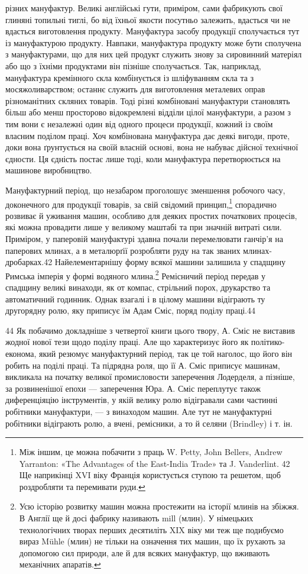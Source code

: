 різних мануфактур. Великі англійські гути, приміром, сами
фабрикують свої глиняні топильні тиглі, бо від їхньої якости
посутньо залежить, вдасться чи не вдасться виготовлення продукту.
Мануфактура засобу продукції сполучається тут із мануфактурою
продукту. Навпаки, мануфактура продукту може бути
сполучена з мануфактурами, що для них цей продукт служить
знову за сировинний матеріял або що з їхніми продуктами він
пізніше сполучається. Так, наприклад, мануфактура кремінного
скла комбінується із шліфуванням скла та з мосяжоливарством;
останнє служить для виготовлення металевих оправ різноманітних
скляних товарів. Тоді різні комбіновані мануфактури
становлять більш або менш просторово відокремлені відділи цілої
мануфактури, а разом з тим вони є незалежні один від одного
процеси продукції, кожний із своїм власним поділом праці. Хоч
комбінована мануфактура дає деякі вигоди, проте, доки вона
ґрунтується на своїй власній основі, вона не набуває дійсної
технічної єдности. Ця єдність постає лише тоді, коли мануфактура
перетворюється на машинове виробництво.

Мануфактурний період, що незабаром проголошує зменшення
робочого часу, доконечного для продукції товарів, за свій свідомий
принцип,\footnote{
Між іншим, це можна побачити з праць W. Petty, John Bellers,
Andrew Yarranton: «The Advantages of the East-India Trade» та J. Vanderlint.
42    Ще наприкінці XVI віку Франція користується ступою та решетом,
щоб роздробляти та перемивати руди.
} спорадично розвиває й уживання машин, особливо
для деяких простих початкових процесів, які можна провадити
лише у великому маштабі та при значній витраті сили. Приміром,
у паперовій мануфактурі здавна почали перемелювати ганчір’я
на паперових млинах, а в металюрґії розробляти руду на так
званих млинах-дробарках.42 Найелементарнішу форму всякої
машини залишила у спадщину Римська імперія у формі водяного
млина.\footnote{
Усю історію розвитку машин можна простежити на історії млинів
на збіжжя. В Англії ще й досі фабрику називають mill (млин). У
німецьких технологічних творах перших десятиліть XIX віку ми теж
ще подибуємо вираз Mühle (млин) не тільки на означення тих машин,
що їх рухають за допомогою сил природи, але й для всяких мануфактур,
що вживають механічних апаратів.
} Ремісничий період передав у спадщину великі винаходи,
як от компас, стрільний порох, друкарство та автоматичний
годинник. Однак взагалі і в цілому машини відіграють ту другорядну
ролю, яку приписує їм Адам Сміс, поряд поділу праці.44

44    Як побачимо докладніше з четвертої книги цього твору, А. Сміс
не виставив жодної нової тези щодо поділу праці. Але що характеризує
його як політико-економа, який резюмує мануфактурний період, так
це той наголос, що його він робить на поділі праці. Та підрядна роля,
що її А. Сміс приписує машинам, викликала на початку великої промисловости
заперечення Лодерделя, а пізніше, за розвиненішої епохи —
заперечення Юра. А. Сміс переплутує також диференціяцію інструментів,
у якій велику ролю відігравали сами частинні робітники мануфактури,
— з винаходом машин. Але тут не мануфактурні робітники
відіграють ролю, а вчені, ремісники, а то й селяни (Brindley) і т. ін.
